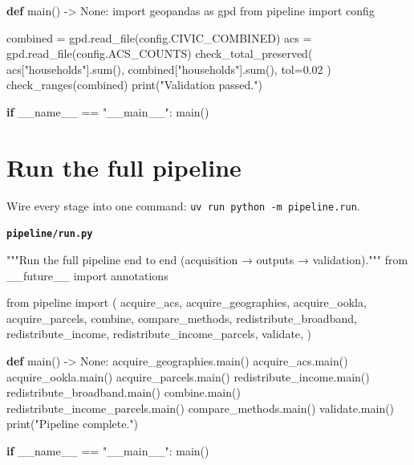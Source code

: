 \documentclass[
  letterpaper,
  DIV=11,
  numbers=noendperiod]{scrreprt}
\newenvironment{Shaded}{\begin{snugshade}}{\end{snugshade}}
\newcommand{\BuiltInTok}[1]{\textcolor[rgb]{0.00,0.23,0.31}{#1}}
\newcommand{\CommentTok}[1]{\textcolor[rgb]{0.37,0.37,0.37}{#1}}
\newcommand{\ControlFlowTok}[1]{\textcolor[rgb]{0.00,0.23,0.31}{\textbf{#1}}}
\newcommand{\FloatTok}[1]{\textcolor[rgb]{0.68,0.00,0.00}{#1}}
\newcommand{\ImportTok}[1]{\textcolor[rgb]{0.00,0.46,0.62}{#1}}
\newcommand{\KeywordTok}[1]{\textcolor[rgb]{0.00,0.23,0.31}{\textbf{#1}}}
\newcommand{\NormalTok}[1]{\textcolor[rgb]{0.00,0.23,0.31}{#1}}
\newcommand{\OperatorTok}[1]{\textcolor[rgb]{0.37,0.37,0.37}{#1}}
\newcommand{\StringTok}[1]{\textcolor[rgb]{0.13,0.47,0.30}{#1}}
\newcommand{\VariableTok}[1]{\textcolor[rgb]{0.07,0.07,0.07}{#1}}
\begin{document}
\begin{Shaded}
\begin{Highlighting}[]
\KeywordTok{def}\NormalTok{ main() }\OperatorTok{{-}\textgreater{}} \VariableTok{None}\NormalTok{:}
    \ImportTok{import}\NormalTok{ geopandas }\ImportTok{as}\NormalTok{ gpd}
    \ImportTok{from}\NormalTok{ pipeline }\ImportTok{import}\NormalTok{ config}

\NormalTok{    combined }\OperatorTok{=}\NormalTok{ gpd.read\_file(config.CIVIC\_COMBINED)}
\NormalTok{    acs }\OperatorTok{=}\NormalTok{ gpd.read\_file(config.ACS\_COUNTS)}
\NormalTok{    check\_total\_preserved(}
\NormalTok{        acs[}\StringTok{"households"}\NormalTok{].}\BuiltInTok{sum}\NormalTok{(), combined[}\StringTok{"households"}\NormalTok{].}\BuiltInTok{sum}\NormalTok{(), tol}\OperatorTok{=}\FloatTok{0.02}
\NormalTok{    )}
\NormalTok{    check\_ranges(combined)}
    \BuiltInTok{print}\NormalTok{(}\StringTok{"Validation passed."}\NormalTok{)}


\ControlFlowTok{if} \VariableTok{\_\_name\_\_} \OperatorTok{==} \StringTok{"\_\_main\_\_"}\NormalTok{:}
\NormalTok{    main()}
\end{Highlighting}
\end{Shaded}

\section{Run the full pipeline}\label{run-the-full-pipeline}

Wire every stage into one command:
\texttt{uv\ run\ python\ -m\ pipeline.run}.

\textbf{\texttt{pipeline/run.py}}

\begin{Shaded}
\begin{Highlighting}[]
\CommentTok{"""Run the full pipeline end to end (acquisition → outputs → validation)."""}
\ImportTok{from}\NormalTok{ \_\_future\_\_ }\ImportTok{import}\NormalTok{ annotations}

\ImportTok{from}\NormalTok{ pipeline }\ImportTok{import}\NormalTok{ (}
\NormalTok{    acquire\_acs,}
\NormalTok{    acquire\_geographies,}
\NormalTok{    acquire\_ookla,}
\NormalTok{    acquire\_parcels,}
\NormalTok{    combine,}
\NormalTok{    compare\_methods,}
\NormalTok{    redistribute\_broadband,}
\NormalTok{    redistribute\_income,}
\NormalTok{    redistribute\_income\_parcels,}
\NormalTok{    validate,}
\NormalTok{)}


\KeywordTok{def}\NormalTok{ main() }\OperatorTok{{-}\textgreater{}} \VariableTok{None}\NormalTok{:}
\NormalTok{    acquire\_geographies.main()}
\NormalTok{    acquire\_acs.main()}
\NormalTok{    acquire\_ookla.main()}
\NormalTok{    acquire\_parcels.main()}
\NormalTok{    redistribute\_income.main()}
\NormalTok{    redistribute\_broadband.main()}
\NormalTok{    combine.main()}
\NormalTok{    redistribute\_income\_parcels.main()}
\NormalTok{    compare\_methods.main()}
\NormalTok{    validate.main()}
    \BuiltInTok{print}\NormalTok{(}\StringTok{"Pipeline complete."}\NormalTok{)}


\ControlFlowTok{if} \VariableTok{\_\_name\_\_} \OperatorTok{==} \StringTok{"\_\_main\_\_"}\NormalTok{:}
\NormalTok{    main()}
\end{Highlighting}
\end{Shaded}
\end{document}
